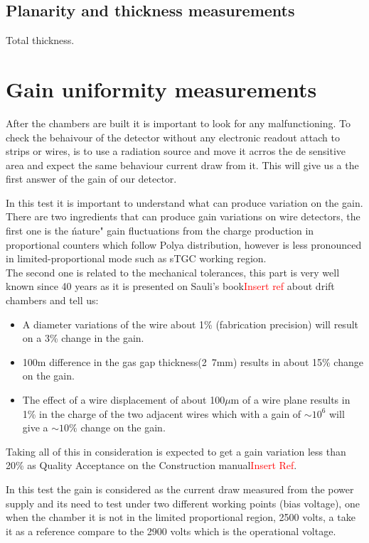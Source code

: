 \subsection{Planarity and thickness measurements}
Total thickness.

\section{Gain uniformity measurements}

After the chambers are built it is important to look for any malfunctioning. To check the behaivour of the detector without
any electronic readout attach to strips or wires, is to use a radiation source and move it acrros the de
sensitive area and expect the same behaviour current draw from it. This will give us a the first answer of the gain of
our detector.\par
In this test it is important to understand what can produce variation on the gain. There are two ingredients that can produce gain variations on wire detectors,
the first one is the \'nature" gain fluctuations from the charge production in proportional counters which follow Polya
distribution, however is less pronounced in limited-proportional mode such as sTGC working region.\\
The second one is related to the mechanical tolerances, this part is very well known since 40 years as it is presented
on Sauli's book\textcolor{red}{Insert ref} about drift chambers and tell us:
\begin{itemize}
\item A diameter variations of the wire about 1\% (fabrication precision) will result on a 3\% change in the gain.
\item  \unit{100}{\micro m} difference in the gas gap thickness(\unit{2.7}{mm}) results in about 15\% change on the gain.
\item The effect of a wire displacement of about \unit{100}{$\mu$m}
of a wire plane results in 1\% in the charge of the two adjacent wires which with a gain of $\sim10^6$ will give a
$\sim10\%$ change on the gain.
\end{itemize}
Taking all of this in consideration is expected to get a gain variation less than 20\% as Quality Acceptance on the
Construction manual\textcolor{red}{Insert Ref}.\par
In this test the gain is considered as the current draw measured from the power supply and its need to test under two different working points (bias voltage), one when the chamber it is not in the limited
proportional region, 2500 volts, a take it as a reference compare to the 2900 volts which is the operational voltage.\par


